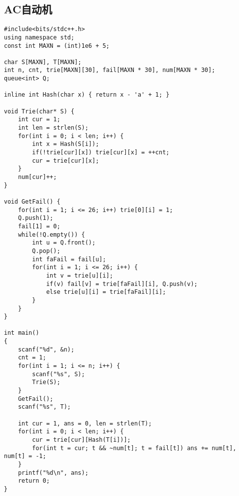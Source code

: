 \subsection{AC自动机}
\begin{lstlisting}
#include<bits/stdc++.h>
using namespace std;
const int MAXN = (int)1e6 + 5;

char S[MAXN], T[MAXN];
int n, cnt, trie[MAXN][30], fail[MAXN * 30], num[MAXN * 30];
queue<int> Q;

inline int Hash(char x) { return x - 'a' + 1; }

void Trie(char* S) {
	int cur = 1;
	int len = strlen(S);
	for(int i = 0; i < len; i++) {
		int x = Hash(S[i]);
		if(!trie[cur][x]) trie[cur][x] = ++cnt;
		cur = trie[cur][x];
	}
	num[cur]++;
}

void GetFail() {
	for(int i = 1; i <= 26; i++) trie[0][i] = 1;
	Q.push(1);
	fail[1] = 0;
	while(!Q.empty()) {
		int u = Q.front();
		Q.pop();
		int faFail = fail[u];
		for(int i = 1; i <= 26; i++) {
			int v = trie[u][i];
			if(v) fail[v] = trie[faFail][i], Q.push(v);
			else trie[u][i] = trie[faFail][i];
		}
	}
}

int main()
{
	scanf("%d", &n);
	cnt = 1;
	for(int i = 1; i <= n; i++) {
		scanf("%s", S);
		Trie(S);
	}
	GetFail(); 
	scanf("%s", T);
	
	int cur = 1, ans = 0, len = strlen(T);
	for(int i = 0; i < len; i++) {
		cur = trie[cur][Hash(T[i])];
		for(int t = cur; t && ~num[t]; t = fail[t]) ans += num[t], num[t] = -1;
	}
	printf("%d\n", ans);
	return 0;
}
\end{lstlisting}

